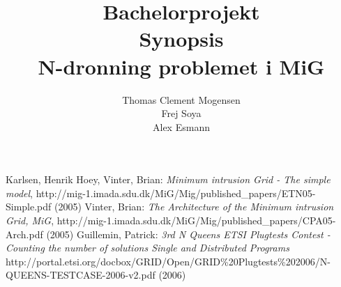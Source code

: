 \documentclass[a4wide,10pt]{article}
\title{Bachelorprojekt\\Synopsis\\N-dronning problemet i MiG}
\author{Thomas Clement Mogensen \\ Frej Soya \\ Alex Esmann }
\begin{document}
\maketitle




\begin{thebibliography}{99}
 Karlsen, Henrik Hoey, Vinter, Brian:
\emph{Minimum intrusion Grid - The simple model},
http://mig-1.imada.sdu.dk/MiG/Mig/published\_papers/ETN05-Simple.pdf (2005)
 Vinter, Brian:
\emph{The Architecture of the Minimum intrusion Grid, MiG},
http://mig-1.imada.sdu.dk/MiG/Mig/published\_papers/CPA05-Arch.pdf
(2005)
 Guillemin, Patrick:
\emph{3rd N Queens ETSI Plugtests Contest - Counting the number of
  solutions Single and Distributed Programs}
http://portal.etsi.org/docbox/GRID/Open/GRID\%20Plugtests\%202006/N-QUEENS-TESTCASE-2006-v2.pdf (2006)
\end{thebibliography}

%
\end{document}
